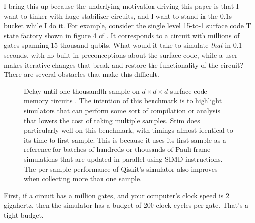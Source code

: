 \documentclass[onecolumn,unpublished]{quantumarticle}
\theoremstyle{definition}
\theoremstyle{definition}
\theoremstyle{definition}
\begin{document}
I bring this up because the underlying motivation driving this paper is that I want to tinker with huge stabilizer circuits, and I want to stand in the 0.1s bucket while I do it.
For example, consider the single level 15-to-1 surface code T state factory shown in figure 4 of \cite{gidney2019catalyzeddistillation}.
It corresponds to a circuit with millions of gates spanning 15 thousand qubits.
What would it take to simulate {\em that} in 0.1 seconds, with no built-in preconceptions about the surface code, while a user makes iterative changes that break and restore the functionality of the circuit?
There are several obstacles that make this difficult.

\begin{figure}
    \centering
    \caption{
        Delay until one thousandth sample on $d \times d \times d$ surface code memory circuits \cite{horsman2012latticesurgery}.
        The intention of this benchmark is to highlight simulators that can perform some sort of compilation or analysis that lowers the cost of taking multiple samples.
        Stim does particularly well on this benchmark, with timings almost identical to its time-to-first-sample.
        This is because it uses its first sample as a reference for batches of hundreds or thousands of Pauli frame simulations that are updated in parallel using SIMD instructions.
        The per-sample performance of Qiskit's simulator also improves when collecting more than one sample.
    }
    \label{fig:bench-surface-1000}
\end{figure}

First, if a circuit has a million gates, and your computer's clock speed is 2 gigahertz, then the simulator has a budget of 200 clock cycles per gate.
That's a tight budget.
\end{document}

